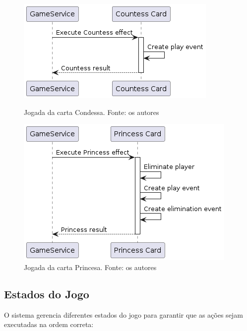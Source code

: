\begin{figure}[h]
    \centering
    \begin{minipage}{0.48\textwidth}
        \centering
        \includegraphics[width=\textwidth]{diagrams/CountessCardPlay.png}
        \caption{Jogada da carta Condessa. Fonte: os autores}
        \label{fig:countess-card-play}
    \end{minipage}
    \hfill
    \begin{minipage}{0.48\textwidth}
        \centering
        \includegraphics[width=\textwidth]{diagrams/PrincessCardPlay.png}
        \caption{Jogada da carta Princesa. Fonte: os autores}
        \label{fig:princess-card-play}
    \end{minipage}
\end{figure}

\subsection{Estados do Jogo}
O sistema gerencia diferentes estados do jogo para garantir que as ações sejam executadas na ordem correta:

